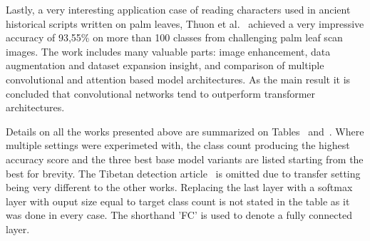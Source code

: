 \documentclass[english,twoside,openright]{UH_DS_MSc}
\begin{document}







Lastly, a very interesting application case of reading characters used in ancient historical scripts written 
on palm leaves, Thuon et al.~\cite{9thuonPalm} achieved a very impressive accuracy of 93,55\% on more than 100 
classes from challenging palm leaf scan images. The work includes many valuable parts: image enhancement,
data augmentation and dataset expansion insight, and comparison of multiple convolutional and attention based model 
architectures. As the main result it is concluded that convolutional networks tend to outperform transformer architectures.

Details on all the works presented above are summarized on Tables~\cite{tab:dataset-info} and~\cite{tab:model-info}. Where multiple settings 
were experimeted with, the class count producing the highest accuracy score and the three best 
base model variants are listed starting from the best for brevity. The Tibetan detection article~\cite{4zhaoTibetan}
is omitted due to transfer setting being very different to the other works. Replacing the last layer with a 
softmax layer with ouput size equal to target class count is not 
stated in the table as it was done in every case. The shorthand 'FC' is used to denote a fully connected layer.
\end{document}
